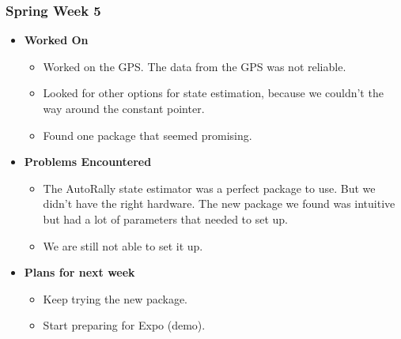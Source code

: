 \documentclass[compsoc,draftclsnofoot,onecolumn,10pt]{IEEEtran}
\begin{document}
\subsubsection{Spring Week 5}
\begin{itemize}
    \item {\textbf{Worked On}}
    \begin{itemize}
      \item Worked on the GPS. The data from the GPS was not reliable.
      \item Looked for other options for state estimation, because we
      couldn't the way around the constant pointer.
      \item Found one package that seemed promising.
    \end{itemize}

    \item {\textbf{Problems Encountered}}
    \begin{itemize}
      \item The AutoRally state estimator was a perfect package to use. But
      we didn't have the right hardware. The new package we found was intuitive
      but had a lot of parameters that needed to set up.
      \item We are still not able to set it up.
    \end{itemize}

    \item{\textbf{Plans for next week}}
    \begin{itemize}
      \item Keep trying the new package.
      \item Start preparing for Expo (demo).
    \end{itemize}

\end{itemize}
\end{document}
